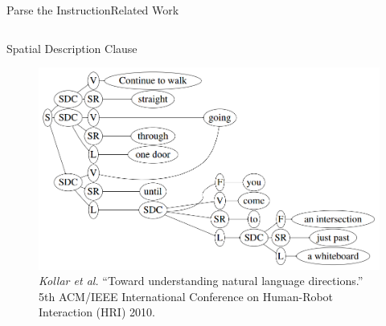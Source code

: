 \begin{frame}{Parse the Instruction}{Related Work}

\begin{columns}
	\begin{block}{Spatial Description Clause}
	\begin{minipage}[t][5.7cm][t]{\textwidth}
		\begin{figure}
			\centering
			\includegraphics[width=\linewidth]{figure/spatial_description_clause}
			\caption{ \tiny{ {\it Kollar et al.} ``Toward understanding natural language directions.'' 5th ACM/IEEE International Conference on Human-Robot Interaction (HRI) 2010.} }
		\end{figure}
	\end{minipage}
	\end{block}


\end{columns}
\end{frame}
